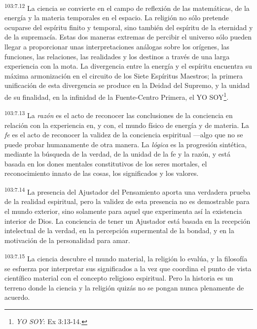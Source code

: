 \documentclass[twoside, 11pt]{book}
\begin{document}
\par
\textsuperscript{103:7.12} La ciencia se convierte en el campo de reflexión de las matemáticas, de la energía y la materia temporales en el espacio. La religión no sólo pretende ocuparse del espíritu finito y temporal, sino también del espíritu de la eternidad y de la supremacía. Estas dos maneras extremas de percibir el universo sólo pueden llegar a proporcionar unas interpretaciones análogas sobre los orígenes, las funciones, las relaciones, las realidades y los destinos a través de una larga experiencia con la mota. La divergencia entre la energía y el espíritu encuentra su máxima armonización en el circuito de los Siete Espíritus Maestros; la primera unificación de esta divergencia se produce en la Deidad del Supremo, y la unidad de su finalidad, en la infinidad de la Fuente-Centro Primera, el YO SOY\footnote{\textit{YO SOY}: Ex 3:13-14.}.

\par
\textsuperscript{103:7.13} La \textit{razón} es el acto de reconocer las conclusiones de la conciencia en relación con la experiencia en, y con, el mundo físico de energía y de materia. La \textit{fe} es el acto de reconocer la validez de la conciencia espiritual ---algo que no se puede probar humanamente de otra manera. La \textit{lógica} es la progresión sintética, mediante la búsqueda de la verdad, de la unidad de la fe y la razón, y está basada en los dones mentales constitutivos de los seres mortales, el reconocimiento innato de las cosas, los significados y los valores.

\par
\textsuperscript{103:7.14} La presencia del Ajustador del Pensamiento aporta una verdadera prueba de la realidad espiritual, pero la validez de esta presencia no es demostrable para el mundo exterior, sino solamente para aquel que experimenta así la existencia interior de Dios. La conciencia de tener un Ajustador está basada en la recepción intelectual de la verdad, en la percepción supermental de la bondad, y en la motivación de la personalidad para amar.

\par
\textsuperscript{103:7.15} La ciencia descubre el mundo material, la religión lo evalúa, y la filosofía se esfuerza por interpretar sus significados a la vez que coordina el punto de vista científico material con el concepto religioso espiritual. Pero la historia es un terreno donde la ciencia y la religión quizás no se pongan nunca plenamente de acuerdo.
\end{document}
